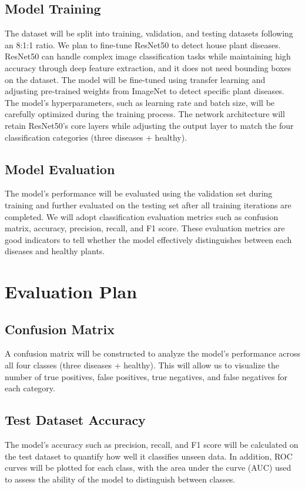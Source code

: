 \documentclass[12pt]{article}
\begin{document}
\subsection{Model Training}
The dataset will be split into training, validation, and testing datasets following an 8:1:1 ratio. We plan to fine-tune ResNet50 to detect house plant diseases. ResNet50 can handle complex image classification tasks while maintaining high accuracy through deep feature extraction, and it does not need bounding boxes on the dataset. The model will be fine-tuned using transfer learning and adjusting pre-trained weights from ImageNet to detect specific plant diseases. The model’s hyperparameters, such as learning rate and batch size, will be carefully optimized during the training process. The network architecture will retain ResNet50's core layers while adjusting the output layer to match the four classification categories (three diseases + healthy).

\subsection{Model Evaluation}
The model’s performance will be evaluated using the validation set during training and further evaluated on the testing set after all training iterations are completed. We will adopt classification evaluation metrics such as confusion matrix, accuracy, precision, recall, and F1 score. These evaluation metrics are good indicators to tell whether the model effectively distinguishes between each diseases and healthy plants. 


\section{Evaluation Plan}
\subsection{Confusion Matrix}
A confusion matrix will be constructed to analyze the model's performance across all four classes (three diseases + healthy). This will allow us to visualize the number of true positives, false positives, true negatives, and false negatives for each category.

\subsection{Test Dataset Accuracy}
The model's accuracy such as precision, recall, and F1 score will be calculated on the test dataset to quantify how well it classifies unseen data. In addition, ROC curves will be plotted for each class, with the area under the curve (AUC) used to assess the ability of the model to distinguish between classes.
\end{document}
